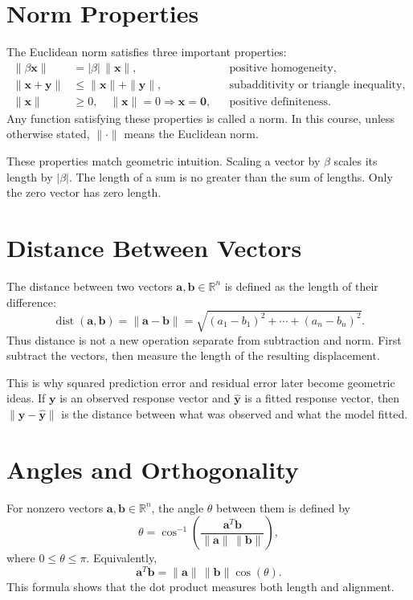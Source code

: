 \section{Norm Properties}
\label{mf:norm-properties}

The Euclidean norm satisfies three important properties:
\[
\begin{aligned}
    \|\beta\mathbf{x}\| &= |\beta|\,\|\mathbf{x}\|, &&\text{positive homogeneity},\\
    \|\mathbf{x}+\mathbf{y}\| &\leq \|\mathbf{x}\|+\|\mathbf{y}\|, &&\text{subadditivity or triangle inequality},\\
    \|\mathbf{x}\| &\geq 0,\quad \|\mathbf{x}\|=0\Rightarrow \mathbf{x}=\mathbf{0}, &&\text{positive definiteness}.
\end{aligned}
\]
Any function satisfying these properties is called a norm. In this course, unless otherwise stated, \(\|\cdot\|\) means the Euclidean norm.

These properties match geometric intuition. Scaling a vector by \(\beta\) scales its length by \(|\beta|\). The length of a sum is no greater than the sum of lengths. Only the zero vector has zero length.

\section{Distance Between Vectors}
\label{mf:vector-distance}

The distance between two vectors \(\mathbf{a},\mathbf{b}\in\mathbb{R}^n\) is defined as the length of their difference:
\[
    \operatorname{dist}(\mathbf{a},\mathbf{b})
    =\|\mathbf{a}-\mathbf{b}\|
    =\sqrt{(a_1-b_1)^2+\cdots+(a_n-b_n)^2}.
\]
Thus distance is not a new operation separate from subtraction and norm. First subtract the vectors, then measure the length of the resulting displacement.

This is why squared prediction error and residual error later become geometric ideas. If \(\mathbf{y}\) is an observed response vector and \(\widehat{\mathbf{y}}\) is a fitted response vector, then \(\|\mathbf{y}-\widehat{\mathbf{y}}\|\) is the distance between what was observed and what the model fitted.

\section{Angles and Orthogonality}
\label{mf:angles}
\label{mf:orthogonality}

For nonzero vectors \(\mathbf{a},\mathbf{b}\in\mathbb{R}^n\), the angle \(\theta\) between them is defined by
\[
    \theta=\cos^{-1}\left(\frac{\mathbf{a}^T\mathbf{b}}{\|\mathbf{a}\|\,\|\mathbf{b}\|}\right),
\]
where \(0\leq \theta\leq \pi\). Equivalently,
\[
    \mathbf{a}^T\mathbf{b}=\|\mathbf{a}\|\,\|\mathbf{b}\|\cos(\theta).
\]
This formula shows that the dot product measures both length and alignment.

